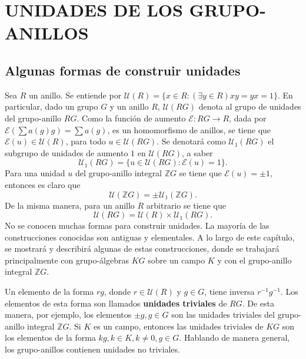 \chapter{UNIDADES DE LOS GRUPO-ANILLOS}\label{chap:unidades}
\section{\quad Algunas formas de construir unidades}
Sea $R$ un anillo. Se entiende por $\mathcal{U}(R) = \{x \in R \colon (\exists y \in R)xy=yx=1\}$. 
En particular, dado un grupo $G$ y un anillo $R$, $\mathcal{U}(RG)$ denota al grupo de unidades del grupo-anillo $RG$. Como la función de aumento $\mathcal{E} \colon RG \to R$, dada por $\mathcal{E} \left( \sum a(g)g \right) = \sum a(g)$, es un homomorfismo de anillos, se tiene que $\mathcal{E}(u) \in \mathcal{U}(R)$, para todo $u \in \mathcal{U}(RG).$ Se denotará como $\mathcal{U}_1(RG)$ el subgrupo de unidades de aumento $1$ en $\mathcal{U}(RG)$, a saber
\[\mathcal{U}_1(RG) = \{u \in \mathcal{U}(RG) \colon \mathcal{E}(u) = 1 \}.\] Para una unidad $u$ del grupo-anillo integral $\mathds{Z}G$ se tiene que $\mathcal{E}(u) = \pm1$, entonces es claro que \[ \mathcal{U}(\mathds{Z}G) = \pm \mathcal U_1(\mathds{Z}G) .\]
De la misma manera, para un anillo $R$ arbitrario se tiene que \[ \mathcal{U}(RG) = \mathcal{U}(R) \times \mathcal{U}_1(RG). \]
No se conocen muchas formas para construir unidades. La mayoría de las construcciones conocidas son antiguas y elementales. A lo largo de este capítulo, se mostrará y describirá algunas de estas construcciones, donde se trabajará principalmente con grupo-álgebras $KG$ sobre un campo $K$ y con el grupo-anillo integral $\mathds{Z}G$.
\begin{ejemplo}
Un elemento de la forma $rg$, donde $r \in \mathcal{U}(R)$ y $g \in G$, tiene inversa $r^{-1}g^{-1}$. Los elementos de esta forma son llamados \textbf{unidades triviales} de $RG$. De esta manera, por ejemplo, los elementos $\pm g, g \in G$ son las unidades triviales del grupo-anillo integral $\mathds{Z}G$. Si $K$ es un campo, entonces las unidades triviales de $KG$ son los elementos de la forma $kg, k \in K, k \neq 0, g \in G$. Hablando de manera general, los grupo-anillos contienen unidades no triviales.
\end{ejemplo}
